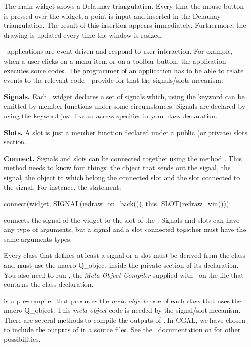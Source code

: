 The main widget shows a
Delaunay triangulation. Every time the mouse button is pressed over 
the widget, a point is input  and inserted in the Delaunay
triangulation. The result of this insertion appears immediately.
Furthermore, the drawing is  updated every time the window is resized.




\qt\ applications are event driven and respond to user interaction.
For example, when a user clicks on a menu item or on a toolbar button,
the application executes some codes. The programmer of an
application has to be able to relate events to the relevant code.
\qt\ provide for that the signals/slots mecanism:
\begin{description}
\item{\bf Signals.}
Each \qt\ widget declares a set of signals which, using the
keyword   can be  emitted by member functions 
under some circumstances. Signals are declared by using 
the keyword  just like an
access specifier in your class declaration.
\item {\bf Slots.}
A slot is just a member function declared under a public (or private)
slots section.
\item{\bf Connect.}
Signals and slots can be connected together using the method 
. This method needs to know four things: the object
that sends out the signal, the signal, 
the object to which belong the connected slot
and the slot connected to the signal.
For instance, the statement:
\begin{ccExampleCode}
connect(widget, SIGNAL(redraw_on_back()),
        this, SLOT(redraw_win()));
\end{ccExampleCode}

connects the signal  of the widget 
to the slot  of the  .
Signals and slots can have any type of arguments, but a signal and a
slot connected together must have the same arguments types.
\end{description}

Every class that defines at least a signal or a slot must be derived
from the class  and must use the macro {\sc Q\_object}
inside the private section of its declaration. You also need to run
, the \emph{Meta Object Compiler} supplied with \qt\, on the
file that contains the class declaration.

 is a pre-compiler that produces the \emph{meta object} code
of each class that uses the macro {\sc Q\_object}. This \emph{meta
  object} code is needed by the signal/slot mecanism. There are
several methods to compile the outputs of . In CGAL, we have
chosen to include the outputs of  in a source files. See the
\qt\ documentation on  for other possibilities.


